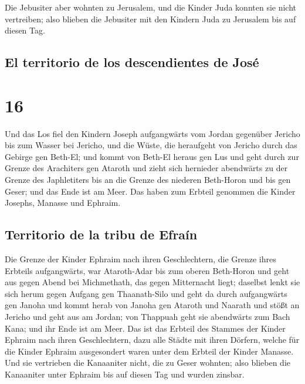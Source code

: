  Die Jebusiter aber wohnten zu Jerusalem, und die Kinder
Juda konnten sie nicht vertreiben; also blieben die Jebusiter mit den
Kindern Juda zu Jerusalem bis auf diesen Tag.

\hypertarget{el-territorio-de-los-descendientes-de-josuxe9}{%
\subsection{El territorio de los descendientes de
José}\label{el-territorio-de-los-descendientes-de-josuxe9}}

\hypertarget{section-15}{%
\section{16}\label{section-15}}

 Und das Los fiel den Kindern Joseph aufgangwärts vom
Jordan gegenüber Jericho bis zum Wasser bei Jericho, und die Wüste, die
heraufgeht von Jericho durch das Gebirge gen Beth-El;  und
kommt von Beth-El heraus gen Lus und geht durch zur Grenze des
Arachiters gen Ataroth  und zieht sich hernieder
abendwärts zu der Grenze des Japhletiters bis an die Grenze des niederen
Beth-Horon und bis gen Geser; und das Ende ist am Meer. 
Das haben zum Erbteil genommen die Kinder Josephs, Manasse und Ephraim.

\hypertarget{territorio-de-la-tribu-de-efrauxedn}{%
\subsection{Territorio de la tribu de
Efraín}\label{territorio-de-la-tribu-de-efrauxedn}}

 Die Grenze der Kinder Ephraim nach ihren Geschlechtern,
die Grenze ihres Erbteils aufgangwärts, war Ataroth-Adar bis zum oberen
Beth-Horon  und geht aus gegen Abend bei Michmethath, das
gegen Mitternacht liegt; daselbst lenkt sie sich herum gegen Aufgang gen
Thaanath-Silo und geht da durch aufgangwärts gen Janoha 
und kommt herab von Janoha gen Ataroth und Naarath und stößt an Jericho
und geht aus am Jordan;  von Thappuah geht sie abendwärts
zum Bach Kana; und ihr Ende ist am Meer. Das ist das Erbteil des Stammes
der Kinder Ephraim nach ihren Geschlechtern,  dazu alle
Städte mit ihren Dörfern, welche für die Kinder Ephraim ausgesondert
waren unter dem Erbteil der Kinder Manasse.  Und sie
vertrieben die Kanaaniter nicht, die zu Geser wohnten; also blieben die
Kanaaniter unter Ephraim bis auf diesen Tag und wurden zinsbar.

